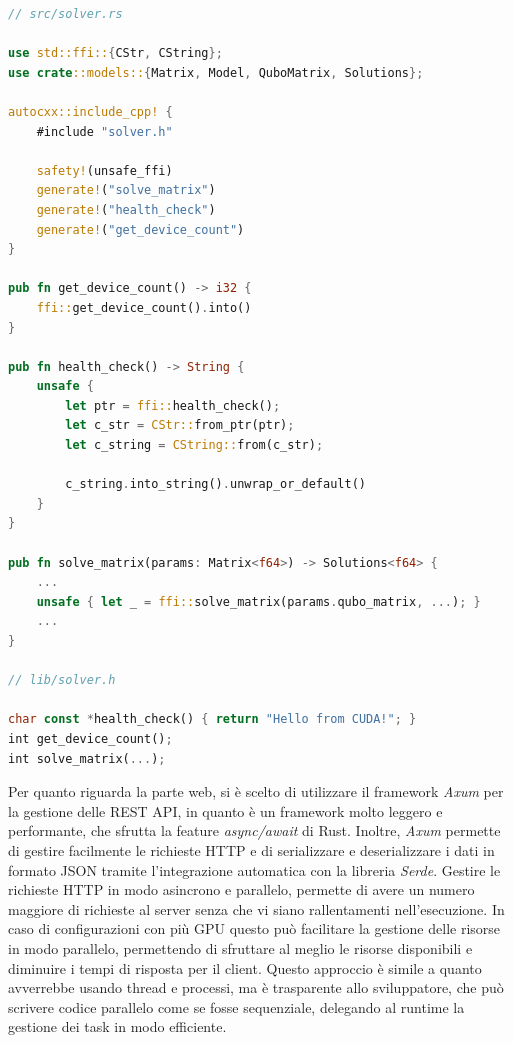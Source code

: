 \newpage
\vspace{5mm}
\begin{lstlisting}[language=Rust, caption=Macro autocxx e uso della FFI, label=lis:generic_glsl]
// src/solver.rs

use std::ffi::{CStr, CString};
use crate::models::{Matrix, Model, QuboMatrix, Solutions};

autocxx::include_cpp! {
    #include "solver.h"

    safety!(unsafe_ffi)
    generate!("solve_matrix")
    generate!("health_check")
    generate!("get_device_count")
}

pub fn get_device_count() -> i32 {
    ffi::get_device_count().into()
}

pub fn health_check() -> String {
    unsafe {
        let ptr = ffi::health_check();
        let c_str = CStr::from_ptr(ptr);
        let c_string = CString::from(c_str);

        c_string.into_string().unwrap_or_default()
    }
}

pub fn solve_matrix(params: Matrix<f64>) -> Solutions<f64> {
    ...
    unsafe { let _ = ffi::solve_matrix(params.qubo_matrix, ...); }
    ...
}

// lib/solver.h

char const *health_check() { return "Hello from CUDA!"; }
int get_device_count();
int solve_matrix(...);
\end{lstlisting}
\vspace{5mm}


Per quanto riguarda la parte web, si è scelto di utilizzare il framework \textit{Axum} per la gestione delle REST \gls{API}, in quanto è un framework molto leggero e performante, che sfrutta la feature \textit{async/await} di Rust. Inoltre, \textit{Axum} permette di gestire facilmente le richieste \gls{HTTP} e di serializzare e deserializzare i dati in formato \gls{JSON} tramite l'integrazione automatica con la libreria \textit{Serde}. Gestire le richieste \gls{HTTP} in modo asincrono e parallelo, permette di avere un numero maggiore di richieste al server senza che vi siano rallentamenti nell'esecuzione. In caso di configurazioni con più \gls{GPU} questo può facilitare la gestione delle risorse in modo parallelo, permettendo di sfruttare al meglio le risorse disponibili e diminuire i tempi di risposta per il client. Questo approccio è simile a quanto avverrebbe usando thread e processi, ma è trasparente allo sviluppatore, che può scrivere codice parallelo come se fosse sequenziale, delegando al runtime la gestione dei task in modo efficiente.

